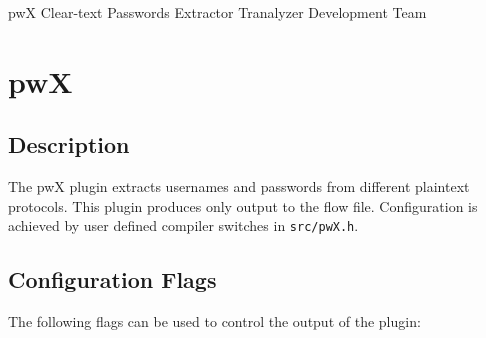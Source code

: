 \documentclass[documentation]{subfiles}
\begin{document}
\trantitle
    {pwX}
    {Clear-text Passwords Extractor}
    {Tranalyzer Development Team} %

\section{pwX}\label{s:pwX}

\subsection{Description}
The pwX plugin extracts usernames and passwords from different plaintext protocols.
This plugin produces only output to the flow file.
Configuration is achieved by user defined compiler switches in {\tt src/pwX.h}.

\subsection{Configuration Flags}
The following flags can be used to control the output of the plugin:
\end{document}
